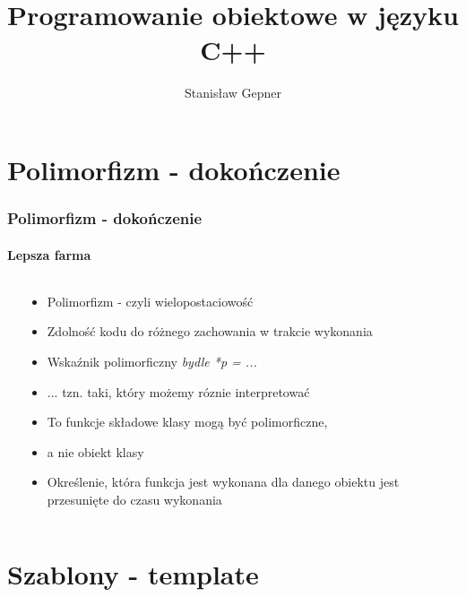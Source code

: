 \documentclass[10pt]{beamer}
\title{Programowanie obiektowe w języku C++}
\author[shortname]{Stanis{\l}aw Gepner}
\institute[shortinst]{sgepner@meil.pw.edu.pl}
\date{}
\begin{document}
\frame{
    \titlepage
}

\section{Polimorfizm - dokończenie}

\begin{frame}
  \frametitle{Polimorfizm - dokończenie}
  \framesubtitle{Lepsza farma}
  
  \begin{columns}
    \begin{column}{0.5\textwidth}
    \end{column}
    \begin{column}{0.6\textwidth}
      \begin{itemize}
        \item Polimorfizm - czyli wielopostaciowość
        \item Zdolność kodu do różnego zachowania w trakcie wykonania
        \item Wskaźnik polimorficzny \textit{bydle *p = ...}
        \item ... tzn. taki, który możemy róznie interpretować
        \item To funkcje składowe klasy mogą być polimorficzne,
        \item a nie obiekt klasy
        \item Określenie, która funkcja jest wykonana dla danego obiektu jest przesunięte do czasu wykonania
      \end{itemize}
    \end{column}
  \end{columns}
\end{frame}

\section{Szablony - template}
\end{document}
